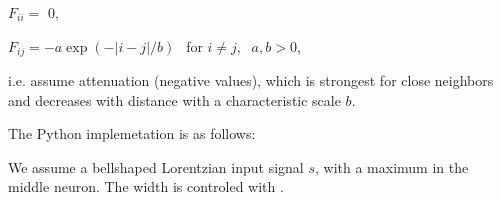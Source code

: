 \documentclass[letterpaper,10pt,english]{jupyterBook}
\begin{document}
\sphinxAtStartPar
\( F_ {ii} = \) 0,

\sphinxAtStartPar
\( F_ {ij} = - a \exp (- | i-j | / b) ~~ \) for \( i \neq j \), \( ~~ a, b> 0 \),

\sphinxAtStartPar
i.e. assume attenuation (negative values), which is strongest for close neighbors and decreases with distance with a characteristic scale \(b\).

\sphinxAtStartPar
The Python implemetation is as follows:

\begin{sphinxVerbatim}[commandchars=\\\{\}]
         
           
           

\PYG{p}{[}\PYG{p}{[}    \PYG{p}{]}    \PYG{p}{]} 
    
   
    \PYG{p}{[}\PYG{p}{]}\PYG{p}{[}\PYG{p}{]}       
    
\end{sphinxVerbatim}

\noindent{}

\sphinxAtStartPar
We assume a bell\sphinxhyphen{}shaped Lorentzian input signal \(s\), with a maximum in the middle neuron. The width is controled with .

\begin{sphinxVerbatim}[commandchars=\\\{\}]
  \PYG{p}{[}        \PYG{p}{]} 
\end{sphinxVerbatim}
\end{document}
